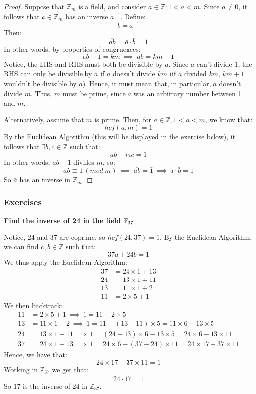 \documentclass{exam}
\begin{document}
\begin{proof}

Suppose that $\mathbb{Z}_m$ is a field, and consider $a \in \mathbb{Z} : 1 < a < m$. Since $a \neq 0$, it follows that $\bar{a} \in \mathbb{Z}_m$ has an inverse $\bar{a}^{-1}$. Define:
\[
\bar{b} = \bar{a}^{-1}
\]
Then:
\[
\overline{ab} = \bar{a} \cdot \bar{b} = 1
\]
In other words, by properties of congruences:
\[
ab - 1 = km \ \implies \ ab = km + 1
\]
Notice, the LHS and RHS must both be divisible by $a$. Since $a$ can't divide 1, the RHS can only be divisible by $a$ if $a$ doesn't divide $km$ (if $a$ divided $km$, $km + 1$ wouldn't be divisible by $a$). Hence, it must mean that, in particular, $a$ doesn't divide $m$. Thus, $m$ must be prime, since $a$ was an arbitrary number between 1 and $m$.

\bigskip

Alternatively, assume that $m$ is prime. Then, for $a \in \mathbb{Z}, 1 < a < m$, we know that:
\[
hcf(a,m) = 1
\]
By the Euclidean Algorithm (this will be displayed in the exercise below), it follows that $\exists b,c \in \mathbb{Z}$ such that:
\[
ab + mc = 1
\]
In other words, $ab - 1$ divides $m$, so:
\[
ab \equiv 1 \ (mod \ m) \ \implies \ \overline{ab} = \bar{1} \ \implies \ \bar{a} \cdot \bar{b} = 1
\]
So $\bar{a}$ has an inverse in $\mathbb{Z}_m$.

\end{proof}

\subsubsection{Exercises}

\begin{questions}

\question \textbf{Find the inverse of 24 in the field $\mathbb{F}_{37}$}

Notice, 24 and 37 are coprime, so $hcf(24,37) = 1$. By the Euclidean Algorithm, we can find $a,b \in \mathbb{Z}$ such that:
\[
37a + 24b = 1
\]
We thus apply the Euclidean Algorithm:
\begin{align*}
    37 &= 24 \times 1 + 13 \\
    24 &= 13 \times 1 + 11 \\
    13 &= 11 \times 1 + 2 \\
    11 &= 2 \times 5 + 1
\end{align*}
We then backtrack:
\begin{align*}
    11 &= 2 \times 5 + 1 \ \implies \ 1 = 11 - 2 \times 5 \\
    13 &= 11 \times 1 + 2 \ \implies \ 1 = 11 - (13 - 11) \times 5 = 11 \times 6 - 13 \times 5\\
    24 &= 13 \times 1 + 11 \ \implies \ 1 = (24 - 13) \times 6 - 13 \times 5 = 24 \times 6 - 13 \times 11 \\
    37 &= 24 \times 1 + 13 \ \implies \ 1 = 24 \times 6 - (37 - 24) \times 11 = 24 \times 17 - 37 \times 11
\end{align*}
Hence, we have that:
\[
24 \times 17 - 37 \times 11 = 1
\]
Working in $\mathbb{Z}_{37}$ we get that:
\[
\bar{24} \cdot \bar{17} = \bar{1}
\]
So 17 is the inverse of 24 in $\mathbb{Z}_{37}$.

\end{questions}
\end{document}
